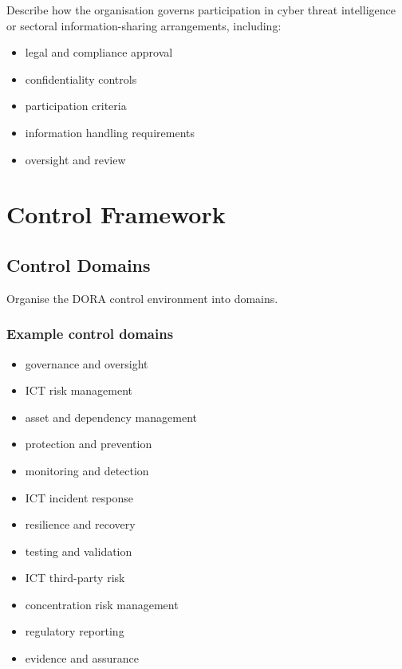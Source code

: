 \documentclass[
  letterpaper,
  DIV=11,
  numbers=noendperiod]{scrartcl}
\providecommand{\tightlist}{%
  \setlength{\itemsep}{0pt}\setlength{\parskip}{0pt}}
\begin{document}
Describe how the organisation governs participation in cyber threat
intelligence or sectoral information-sharing arrangements, including:

\begin{itemize}
\tightlist
\item
  legal and compliance approval
\item
  confidentiality controls
\item
  participation criteria
\item
  information handling requirements
\item
  oversight and review
\end{itemize}

\section{Control Framework}\label{control-framework}

\subsection{Control Domains}\label{control-domains}

Organise the DORA control environment into domains.

\subsubsection{Example control domains}\label{example-control-domains}

\begin{itemize}
\tightlist
\item
  governance and oversight
\item
  ICT risk management
\item
  asset and dependency management
\item
  protection and prevention
\item
  monitoring and detection
\item
  ICT incident response
\item
  resilience and recovery
\item
  testing and validation
\item
  ICT third-party risk
\item
  concentration risk management
\item
  regulatory reporting
\item
  evidence and assurance
\end{itemize}
\end{document}
